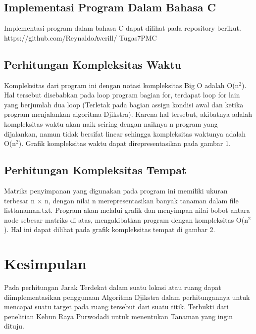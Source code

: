 \documentclass[10pt]{IEEEtran}
\begin{document}
\subsection{Implementasi Program Dalam Bahasa C}
Implementasi program dalam bahasa C dapat dilihat
pada repository berikut. https://github.com/ReynaldoAverill/
Tugas7PMC

\subsection{Perhitungan Kompleksitas Waktu}
Kompleksitas dari program ini dengan notasi kompleksitas
Big O adalah O(n$^{2}$). Hal tersebut disebabkan pada loop
program bagian for, terdapat loop for lain yang berjumlah
dua loop (Terletak pada bagian assign kondisi awal dan ketika
program menjalankan algoritma Djikstra). Karena hal tersebut,
akibatnya adalah kompleksitas waktu akan naik seiring dengan
naiknya n program yang dijalankan, namun tidak bersifat
linear sehingga kompleksitas waktunya adalah O(n$^{2}$). Grafik
kompleksitas waktu dapat direpresentasikan pada gambar 1.

\subsection{Perhitungan Kompleksitas Tempat}
Matriks penyimpanan yang digunakan pada program ini
memiliki ukuran terbesar n × n, dengan nilai n merepresentasikan banyak tanaman dalam file listtanaman.txt. Program
akan melalui grafik dan menyimpan nilai bobot antara node
sebesar matriks di atas, mengakibatkan program dengan kompleksitas O(n$^{2}$). 
Hal ini dapat dilihat pada grafik kompleksitas
tempat di gambar 2.


\section{Kesimpulan}
Pada perhitungan Jarak Terdekat dalam suatu lokasi atau ruang 
dapat diimplementasikan penggunaan Algoritma Djikstra
dalam perhitungannya untuk mencapai suatu target pada ruang
tersebut dari suatu titik. Terbukti dari penelitian Kebun Raya
Purwodadi untuk menentukan Tanaman yang ingin dituju.




\end{document}
